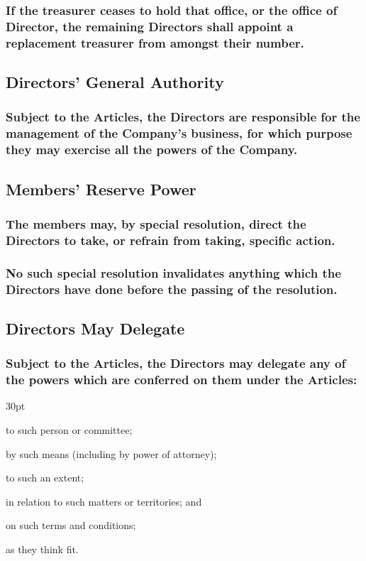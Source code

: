 \documentclass[12pt]{article}
\def\clauseindent{30pt}
\newenvironment{subindentpara}{\begin{adjustwidth}{\clauseindent}{}\begin{hanginglist}}{\end{hanginglist}\end{adjustwidth}}
\begin{document}
\subsubsection[Replacement treasurer must be appointed]{If the treasurer ceases to hold that office, or the office of Director, the remaining Directors shall appoint a replacement treasurer from amongst their number.}

\subsection{Directors' General Authority}
\subsubsection[Directors may exercise all powers of the Company]{Subject to the Articles, the Directors are responsible for the management of the Company's business, for which purpose they may exercise all the powers of the Company.}

\subsection{Members' Reserve Power}
\subsubsection[Members may instruct Directors]{The members may, by special resolution, direct the Directors to take, or refrain from taking, specific action.}
\subsubsection[Members' instruction may not invalidate Directors' actions]{No such special resolution invalidates anything which the Directors have done before the passing of the resolution.}

\subsection{Directors May Delegate}
\subsubsection[Specifics of Directors' delegation]{Subject to the Articles, the Directors may delegate any of the powers which are conferred on them under the Articles:}
\begin{subindentpara}
    \item to such person or committee;
    \item by such means (including by power of attorney);
    \item to such an extent;
    \item in relation to such matters or territories; and
    \item on such terms and conditions;
    \item as they think fit.
\end{subindentpara}
\end{document}
